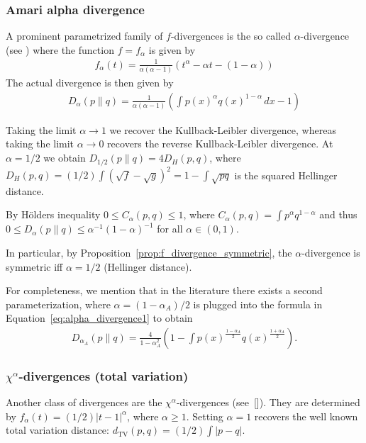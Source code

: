 \subsubsection*{Amari alpha divergence}

A prominent parametrized family of $f$-divergences is the so called $\alpha$-divergence (see \cite{cichocki_families_2010}) where the function $f=f_{\alpha}$ is given by
\begin{align*}
    f_{\alpha}(t)=\frac{1}{\alpha(\alpha-1)}\left(t^{\alpha}-\alpha t-(1-\alpha)\right)
\end{align*}
The actual divergence is then given by
\begin{align}\label{eq:alpha_divergence1}
    D_{\alpha}(p\|q)=\frac{1}{\alpha(\alpha-1)}\left(\int p(x)^{\alpha}q(x)^{1-\alpha}\,dx-1\right)
\end{align}

Taking the limit $\alpha\to1$ we recover the Kullback-Leibler divergence, whereas taking the limit $\alpha\to0$ recovers the reverse Kullback-Leibler divergence. At $\alpha=1/2$ we obtain $D_{1/2}(p\|q)=4D_H(p,q)$, where $D_H(p,q)=(1/2)\int(\sqrt{f}-\sqrt{g})^2=1-\int\sqrt{pq}$ is the squared Hellinger distance.

By Hölders inequality $0\le C_{\alpha}(p,q)\le 1$, where $C_{\alpha}(p,q)=\int p^{\alpha}q^{1-\alpha}$ and thus $0\le D_{\alpha}(p\| q)\le\alpha^{-1}(1-\alpha)^{-1}$ for all $\alpha\in(0,1)$.

In particular, by Proposition~\ref{prop:f_divergence_symmetric}, the $\alpha$-divergence is symmetric iff $\alpha=1/2$ (Hellinger distance).

For completeness, we mention that in the literature there exists a second parameterization, where $\alpha=(1-\alpha_{A})/2$ is plugged into the formula in Equation~\eqref{eq:alpha_divergence1} to obtain
\begin{align*}
    D_{\alpha_A}(p\|q)=\frac{4}{1-\alpha_A^2}\left(1-\int p(x)^{\frac{1-\alpha_A}{2}}q(x)^{\frac{1+\alpha_A}{2}}\right).
\end{align*}

\subsubsection*{\texorpdfstring{$\chi^{\alpha}$}{chi-alpha}-divergences (total variation)}

Another class of divergences are the $\chi^{\alpha}$-divergences (see~[]). They are determined by $f_{\alpha}(t)=(1/2)|t-1|^{\alpha}$, where $\alpha\ge1$. Setting $\alpha=1$ recovers the well known total variation distance: $d_{\text{TV}}(p,q)=(1/2)\int|p-q|$.

